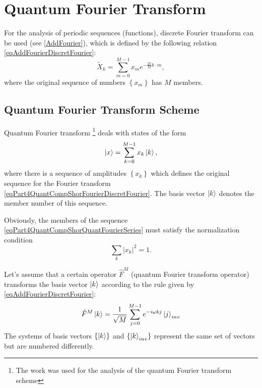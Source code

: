 \section{Quantum Fourier Transform}
For the analysis of periodic sequences (functions), discrete Fourier transform can be used (see \autoref{AddFourier}), which is defined by the following relation \eqref{eqAddFourierDiscretFourier}:
\begin{equation}
\tilde{X}_k = \sum^{M - 1}_{m = 0} x_m e^{-\frac{2 \pi}{M} k\cdot m},
\label{eqPart4QuantCompShorFourierDiscretFourier}
\end{equation}
where the original sequence of numbers $\left\{x_m\right\}$ has $M$ members.

\subsection{Quantum Fourier Transform Scheme}
Quantum Fourier transform \footnote{The work \cite{DBLP:conf/new2an/2015} was used for the analysis of the quantum Fourier transform scheme} deals with states of the form 
\begin{equation}
\ket{x} = \sum_{k = 0}^{M - 1}x_k \ket{k},
\label{eqPart4QuantCompShorQuantFourierSeries}
\end{equation}
where there is a sequence of amplitudes $\left\{x_k\right\}$ which defines the original sequence for the Fourier transform \eqref{eqPart4QuantCompShorFourierDiscretFourier}. The basis vector $\ket{k}$ denotes the member number of this sequence.

Obviously, the members of the sequence \eqref{eqPart4QuantCompShorQuantFourierSeries} must satisfy the normalization condition 
\[
\sum_k\left|x_k\right|^2 = 1.
\]

Let's assume that a certain operator $\hat{F}^{M}$ (quantum Fourier transform operator) transforms the basis vector $\ket{k}$ according to the rule given by \eqref{eqAddFourierDiscretFourier}:
\begin{equation}
\hat{F}^{M}\ket{k} = \frac{1}{\sqrt{M}}\sum_{j = 0}^{M -1}
e^{-i \omega k j}\ket{j}_{inv} 
\label{eqPart4QuantCompShorQuantFourierBasis}
\end{equation}
The systems of basis vectors $\left\{\ket{k}\right\}$ and 
$\left\{\ket{k}_{inv}\right\}$ represent the same set of vectors but are numbered differently.

